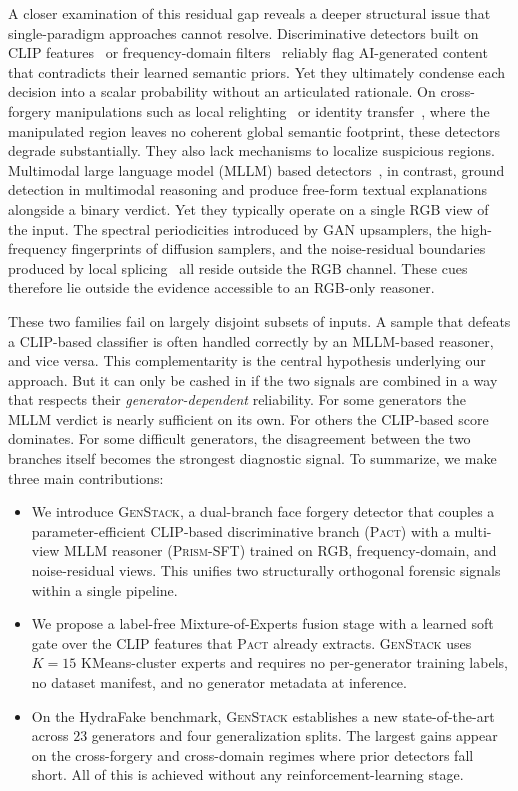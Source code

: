 \documentclass[10pt,twocolumn,letterpaper]{article}
\newcommand{\vfive}{\textsc{Pact}}
\newcommand{\prism}{\textsc{Prism-SFT}}
\begin{document}
A closer examination of this residual gap reveals a deeper structural issue that single-paradigm approaches cannot resolve. Discriminative detectors built on CLIP features~\cite{univfd,lnclipdf} or frequency-domain filters~\cite{f3net} reliably flag AI-generated content that contradicts their learned semantic priors. Yet they ultimately condense each decision into a scalar probability without an articulated rationale. On cross-forgery manipulations such as local relighting~\cite{iclight} or identity transfer~\cite{starganv2}, where the manipulated region leaves no coherent global semantic footprint, these detectors degrade substantially. They also lack mechanisms to localize suspicious regions. Multimodal large language model (MLLM) based detectors~\cite{veritas,fakeshield,fakevlm}, in contrast, ground detection in multimodal reasoning and produce free-form textual explanations alongside a binary verdict. Yet they typically operate on a single RGB view of the input. The spectral periodicities introduced by GAN upsamplers, the high-frequency fingerprints of diffusion samplers, and the noise-residual boundaries produced by local splicing~\cite{srm} all reside outside the RGB channel. These cues therefore lie outside the evidence accessible to an RGB-only reasoner.

These two families fail on largely disjoint subsets of inputs. A sample that defeats a CLIP-based classifier is often handled correctly by an MLLM-based reasoner, and vice versa. This complementarity is the central hypothesis underlying our approach. But it can only be cashed in if the two signals are combined in a way that respects their \emph{generator-dependent} reliability. For some generators the MLLM verdict is nearly sufficient on its own. For others the CLIP-based score dominates. For some difficult generators, the disagreement between the two branches itself becomes the strongest diagnostic signal. To summarize, we make three main contributions:
\begin{itemize}[leftmargin=*, itemsep=1pt]
    \item We introduce \textsc{GenStack}, a dual-branch face forgery detector that couples a parameter-efficient CLIP-based discriminative branch (\vfive) with a multi-view MLLM reasoner (\prism) trained on RGB, frequency-domain, and noise-residual views. This unifies two structurally orthogonal forensic signals within a single pipeline.
    \item We propose a label-free Mixture-of-Experts fusion stage with a learned soft gate over the CLIP features that \vfive{} already extracts. \textsc{GenStack} uses $K{=}15$ KMeans-cluster experts and requires no per-generator training labels, no dataset manifest, and no generator metadata at inference.
    \item On the HydraFake benchmark, \textsc{GenStack} establishes a new state-of-the-art across $23$ generators and four generalization splits. The largest gains appear on the cross-forgery and cross-domain regimes where prior detectors fall short. All of this is achieved without any reinforcement-learning stage.
\end{itemize}
\end{document}
